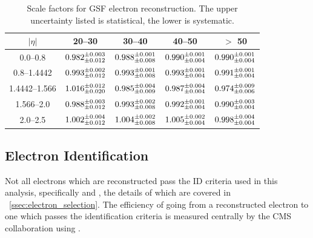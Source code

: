 \begin{table}[h]
\centering
{}
\begin{center}
    \begin{tabular}{@{}c c c c c@{}}
    \toprule
	$|\eta|$                 & 20--30 \GeV                        & 30--40 \GeV                        & 40--50 \GeV                        & $>$ 50 \GeV                        \\
    \midrule
	\numrange{0.0}{0.8}      & $0.982^{\pm 0.003}_{\pm 0.012}$ & $0.988^{\pm 0.001}_{\pm 0.008}$ & $0.990^{\pm 0.001}_{\pm 0.004}$ & $0.990^{\pm 0.001}_{\pm 0.004}$ \\
	\numrange{0.8}{1.4442}   & $0.993^{\pm 0.002}_{\pm 0.012}$ & $0.993^{\pm 0.001}_{\pm 0.008}$ & $0.993^{\pm 0.001}_{\pm 0.004}$ & $0.991^{\pm 0.001}_{\pm 0.004}$ \\
	\numrange{1.4442}{1.566} & $1.016^{\pm 0.012}_{\pm 0.020}$ & $0.985^{\pm 0.004}_{\pm 0.009}$ & $0.987^{\pm 0.004}_{\pm 0.004}$ & $0.974^{\pm 0.009}_{\pm 0.006}$ \\
	\numrange{1.566}{2.0}    & $0.988^{\pm 0.003}_{\pm 0.012}$ & $0.993^{\pm 0.002}_{\pm 0.008}$ & $0.992^{\pm 0.001}_{\pm 0.004}$ & $0.990^{\pm 0.003}_{\pm 0.004}$ \\
	\numrange{2.0}{2.5}      & $1.002^{\pm 0.004}_{\pm 0.012}$ & $1.004^{\pm 0.002}_{\pm 0.008}$ & $1.005^{\pm 0.002}_{\pm 0.004}$ & $0.998^{\pm 0.004}_{\pm 0.004}$ \\
    \bottomrule
    \end{tabular}
\end{center}
\caption{
    Scale factors for GSF electron reconstruction. The upper uncertainty listed
    is statistical, the lower is systematic.
}
\label{table:gsf_scale_factor}
\end{table}

\subsection{Electron Identification}
\label{ssec:sf_id}

Not all electrons which are reconstructed pass the ID criteria used in this
analysis, specifically \EGMEDIUM and \EGTIGHT, the details of which are covered
in \SEC~\ref{ssec:electron_selection}. The efficiency of going from a
reconstructed electron to one which passes the identification criteria is
measured centrally by the CMS collaboration using \TnP \cite{cms_an_2014-055}.

